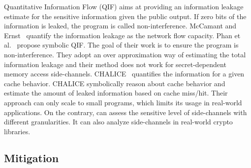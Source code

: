 Quantitative Information Flow (QIF) aims at providing an information
leakage estimate for the sensitive information given the public
output. If zero bits of the information is leaked, the program is
called non-interference. McCamant and Ernst~\cite{McCamantE2008} quantify the
information leakage as the network flow
capacity. Phan et al.~\cite{Phan:2012:SQI:2382756.2382791} propose symbolic
QIF. The goal of their work is to ensure the program is
non-interference. They adopt an over approximation way of estimating
the total information leakage and their method does not work for
secret-dependent memory access
side-channels. CHALICE~\cite{Chattopadhyay:2017:QIL:3127041.3127044}
quantifies the information for a given cache behavior. CHALICE 
symbolically reason about cache behavior and estimate the amount
of leaked information based on cache miss/hit.
Their approach can only scale to small programs, 
which limits its usage in real-world applications.
On the contrary, \tool{} can assess the sensitive level of 
side-channels with different granularities. It can also analyze
side-channels in real-world crypto libraries. 

\subsection{Mitigation}
